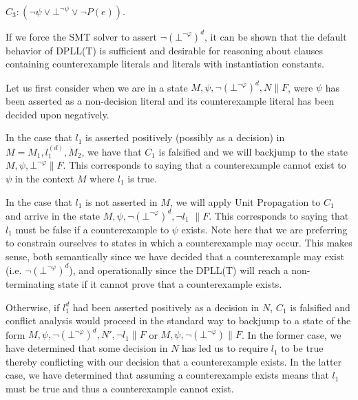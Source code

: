 \documentclass{llncs}
\begin{document}
$C_3 : ( \neg \psi \vee \bot^{\neg \psi} \vee \neg P( e ) )$.

If we force the SMT solver to assert $\neg( \bot^{\neg \varphi} )^d$, it can be shown that the default behavior of DPLL(T) is sufficient and desirable for reasoning about clauses containing counterexample literals and literals with instantiation constants.

Let us first consider when we are in a state $M, \psi, \neg( \bot^{\neg \varphi} )^d, N \parallel F$, were $\psi$ has been asserted as a non-decision literal and its counterexample literal has been decided upon negatively.

In the case that $l_1$ is asserted positively (possibly as a decision) in $M = M_1, l^{(d)}_1, M_2$, we have that $C_1$ is falsified and we will backjump to the state $M, \psi, \bot^{\neg \varphi} \parallel F$.
This corresponds to saying that a counterexample cannot exist to $\psi$ in the context $M$ where $l_1$ is true.

In the case that $l_1$ is not asserted in $M$, we will apply Unit Propagation to $C_1$ and arrive in the state $M, \psi, \neg( \bot^{\neg \varphi} )^d, \neg l_1$ $\parallel F$.
This corresponds to saying that $l_1$ must be false if a counterexample to $\psi$ exists.
Note here that we are preferring to constrain ourselves to states in which a counterexample may occur.
This makes sense, both semantically since we have decided that a counterexample may exist (i.e. $\neg( \bot^{\neg \varphi} )^d$), and operationally since the DPLL(T) will reach a non-terminating state if it cannot prove that a counterexample exists.

Otherwise, if $l_1^d$ had been asserted positively as a decision in $N$, $C_1$ is falsified and conflict analysis would proceed in the standard way to backjump to a state of the form $M, \psi, \neg( \bot^{\neg \varphi} )^d, N', \neg l_1 \parallel F$ or $M, \psi, \neg( \bot^{\neg \varphi} )  \parallel F$.
In the former case, we have determined that some decision in $N$ has led us to require $l_1$ to be true thereby conflicting with our decision that a counterexample exists.
In the latter case, we have determined that assuming a counterexample exists means that $l_1$ must be true and thus a counterexample cannot exist.


\end{document}
